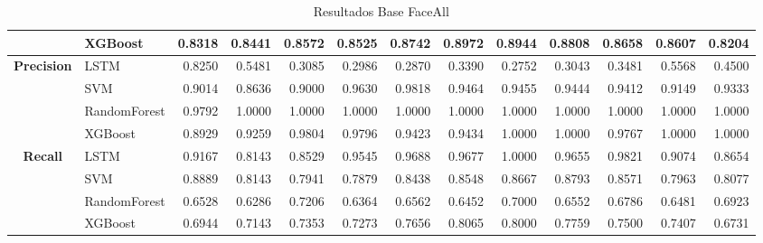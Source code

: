 \begin{table}[h]
\begin{adjustbox}{max width=16cm}
\begin{tabular}{|c|l|r|r|r|r|r|r|r|r|r|r|r|}
	& XGBoost &  0.8318 &  0.8441 &  0.8572 &  0.8525 &  0.8742 &  0.8972 &  0.8944 &  0.8808 &  0.8658 &  0.8607 &  0.8204 \\
	\hline
	\textbf{Precision} & LSTM &  0.8250 &  0.5481 &  0.3085 &  0.2986 &  0.2870 &  0.3390 &  0.2752 &  0.3043 &  0.3481 &  0.5568 &  0.4500 \\
	& SVM &  0.9014 &  0.8636 &  0.9000 &  0.9630 &  0.9818 &  0.9464 &  0.9455 &  0.9444 &  0.9412 &  0.9149 &  0.9333 \\
	& RandomForest &  0.9792 &  1.0000 &  1.0000 &  1.0000 &  1.0000 &  1.0000 &  1.0000 &  1.0000 &  1.0000 &  1.0000 &  1.0000 \\
	& XGBoost &  0.8929 &  0.9259 &  0.9804 &  0.9796 &  0.9423 &  0.9434 &  1.0000 &  1.0000 &  0.9767 &  1.0000 &  1.0000 \\
	\hline
	\textbf{Recall} & LSTM &  0.9167 &  0.8143 &  0.8529 &  0.9545 &  0.9688 &  0.9677 &  1.0000 &  0.9655 &  0.9821 &  0.9074 &  0.8654 \\
	& SVM &  0.8889 &  0.8143 &  0.7941 &  0.7879 &  0.8438 &  0.8548 &  0.8667 &  0.8793 &  0.8571 &  0.7963 &  0.8077 \\
	& RandomForest &  0.6528 &  0.6286 &  0.7206 &  0.6364 &  0.6562 &  0.6452 &  0.7000 &  0.6552 &  0.6786 &  0.6481 &  0.6923 \\
	& XGBoost &  0.6944 &  0.7143 &  0.7353 &  0.7273 &  0.7656 &  0.8065 &  0.8000 &  0.7759 &  0.7500 &  0.7407 &  0.6731 \\
	\hline
\end{tabular}
\end{adjustbox}
\label{tab:FaceAllBase}
\caption{Resultados Base FaceAll}
\end{table}
